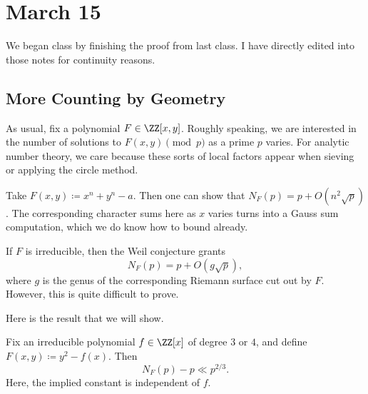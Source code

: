 \documentclass[../notes.tex]{subfiles}
\begin{document}
\section{March 15}

We began class by finishing the proof from last class. I have directly edited into those notes for continuity reasons.

\subsection{More Counting by Geometry}
As usual, fix a polynomial $F\in\ZZ[x,y]$. Roughly speaking, we are interested in the number of solutions to $F(x,y)\pmod p$ as a prime $p$ varies. For analytic number theory, we care because these sorts of local factors appear when sieving or applying the circle method.
\begin{example}
	Take $F(x,y)\coloneqq x^n+y^n-a$. Then one can show that $N_F(p)=p+O\left(n^2\sqrt p\right)$. The corresponding character sums here as $x$ varies turns into a Gauss sum computation, which we do know how to bound already.
\end{example}
\begin{remark}
	If $F$ is irreducible, then the Weil conjecture grants
	\[N_F(p)=p+O(g\sqrt p),\]
	where $g$ is the genus of the corresponding Riemann surface cut out by $F$. However, this is quite difficult to prove.
\end{remark}
Here is the result that we will show.
\begin{theorem} \label{thm:mordell}
	Fix an irreducible polynomial $f\in\ZZ[x]$ of degree $3$ or $4$, and define $F(x,y)\coloneqq y^2-f(x)$. Then
	\[N_F(p)-p\ll p^{2/3}.\]
	Here, the implied constant is independent of $f$.
\end{theorem}
\end{document}
